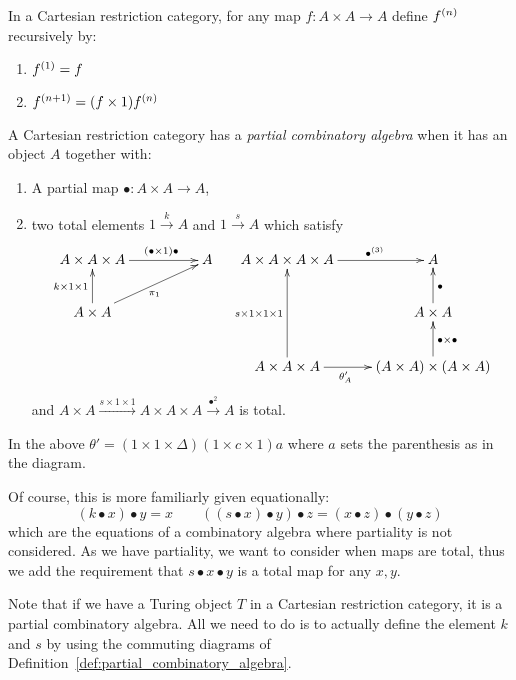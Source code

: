 \begin{definition}\label{def:multi-self-map}
  In a Cartesian restriction category, for any map $f:A\times A\to A$ define ${f}^{(n)}$
  recursively by:
  \begin{enumerate}[{(}i{)}]
  \item ${f}^{(1)} = f$
  \item ${f}^{(n+1)} = (f\times 1) {f}^{(n)}$
  \end{enumerate}
\end{definition}
\begin{definition}\label{def:partial_combinatory_algebra}
  A Cartesian restriction category has a \emph{partial combinatory algebra} when it has an object
  $A$ together with:
  \begin{enumerate}[{(}i{)}]
  \item A partial map $\bullet:A\times A \to A$,
  \item two total elements $1\xrightarrow{k}A$ and $1\xrightarrow{s}{A}$ which satisfy
    \[
      \xymatrix@C+25pt{
        A\times A\times A \ar[r]^(.6){(\bullet\times 1)\bullet} & A\\
        A\times A \ar[u]^{k\times1\times1} \ar[ur]_{\pi_1}
      }\quad
      \xymatrix{
        A\times A\times A\times A \ar[r]^(.6){\multibullet{3}}&A\\
        &A\times A \ar[u]_{\bullet}\\
        A\times A\times A \ar[uu]^{s\times1\times1\times1} \ar[r]_(.4){\theta_A'}
          & (A\times A) \times (A\times A) \ar[u]_{\bullet\times\bullet}
      }
    \]
    and $A\times A \xrightarrow{s\times1\times1} A\times A\times A \xrightarrow{\bullet^2} A$ is total.
  \end{enumerate}
  In the above $\theta' = (1\times1\times\Delta)(1\times c \times 1)a$ where $a$ sets the
  parenthesis as in the diagram.
\end{definition}

Of course, this is more familiarly given equationally:
\[
   (k\bullet x)\bullet y = x \qquad ((s\bullet x)\bullet y) \bullet z = (x\bullet z) \bullet
   (y\bullet z)
\]
which are the equations of a combinatory algebra where partiality is not considered. As we have
partiality, we want to consider when maps are total, thus we add the requirement that
$s\bullet x\bullet y$ is a
total map for any $x,y$.

Note that if we have a Turing object $T$ in a Cartesian restriction category, it is a partial
combinatory algebra. All we need to do is to actually define the element $k$ and $s$ by using the
commuting diagrams of Definition~\ref{def:partial_combinatory_algebra}.


